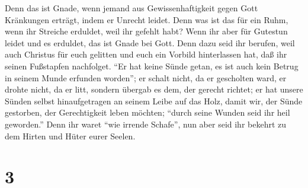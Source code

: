  Denn das ist Gnade, wenn jemand aus Gewissenhaftigkeit
gegen Gott Kränkungen erträgt, indem er Unrecht leidet. 
Denn was ist das für ein Ruhm, wenn ihr Streiche erduldet, weil ihr
gefehlt habt? Wenn ihr aber für Gutestun leidet und es erduldet, das ist
Gnade bei Gott.  Denn dazu seid ihr berufen, weil auch
Christus für euch gelitten und euch ein Vorbild hinterlassen hat, daß
ihr seinen Fußstapfen nachfolget.  ``Er hat keine Sünde
getan, es ist auch kein Betrug in seinem Munde erfunden worden'';
 er schalt nicht, da er gescholten ward, er drohte nicht,
da er litt, sondern übergab es dem, der gerecht richtet; 
er hat unsere Sünden selbst hinaufgetragen an seinem Leibe auf das Holz,
damit wir, der Sünde gestorben, der Gerechtigkeit leben möchten; ``durch
seine Wunden seid ihr heil geworden.''  Denn ihr waret
``wie irrende Schafe'', nun aber seid ihr bekehrt zu dem Hirten und
Hüter eurer Seelen.

\hypertarget{section-2}{%
\section{3}\label{section-2}}

